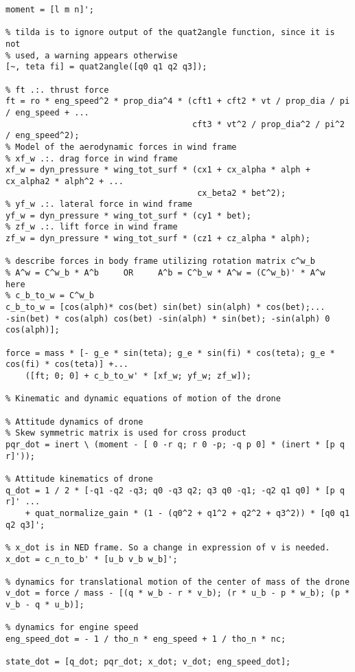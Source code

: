\begin{lstlisting}
moment = [l m n]';

% tilda is to ignore output of the quat2angle function, since it is not
% used, a warning appears otherwise
[~, teta fi] = quat2angle([q0 q1 q2 q3]);

% ft .:. thrust force 
ft = ro * eng_speed^2 * prop_dia^4 * (cft1 + cft2 * vt / prop_dia / pi / eng_speed + ...
									  cft3 * vt^2 / prop_dia^2 / pi^2 / eng_speed^2);
% Model of the aerodynamic forces in wind frame
% xf_w .:. drag force in wind frame
xf_w = dyn_pressure * wing_tot_surf * (cx1 + cx_alpha * alph + cx_alpha2 * alph^2 + ...
									   cx_beta2 * bet^2);
% yf_w .:. lateral force in wind frame
yf_w = dyn_pressure * wing_tot_surf * (cy1 * bet);
% zf_w .:. lift force in wind frame
zf_w = dyn_pressure * wing_tot_surf * (cz1 + cz_alpha * alph);

% describe forces in body frame utilizing rotation matrix c^w_b
% A^w = C^w_b * A^b     OR     A^b = C^b_w * A^w = (C^w_b)' * A^w  here
% c_b_to_w = C^w_b
c_b_to_w = [cos(alph)* cos(bet) sin(bet) sin(alph) * cos(bet);...
-sin(bet) * cos(alph) cos(bet) -sin(alph) * sin(bet); -sin(alph) 0 cos(alph)];

force = mass * [- g_e * sin(teta); g_e * sin(fi) * cos(teta); g_e * cos(fi) * cos(teta)] +...
    ([ft; 0; 0] + c_b_to_w' * [xf_w; yf_w; zf_w]);

% Kinematic and dynamic equations of motion of the drone

% Attitude dynamics of drone
% Skew symmetric matrix is used for cross product
pqr_dot = inert \ (moment - [ 0 -r q; r 0 -p; -q p 0] * (inert * [p q r]'));

% Attitude kinematics of drone
q_dot = 1 / 2 * [-q1 -q2 -q3; q0 -q3 q2; q3 q0 -q1; -q2 q1 q0] * [p q r]' ...
    + quat_normalize_gain * (1 - (q0^2 + q1^2 + q2^2 + q3^2)) * [q0 q1 q2 q3]';

% x_dot is in NED frame. So a change in expression of v is needed.
x_dot = c_n_to_b' * [u_b v_b w_b]';

% dynamics for translational motion of the center of mass of the drone
v_dot = force / mass - [(q * w_b - r * v_b); (r * u_b - p * w_b); (p * v_b - q * u_b)];

% dynamics for engine speed
eng_speed_dot = - 1 / tho_n * eng_speed + 1 / tho_n * nc;

state_dot = [q_dot; pqr_dot; x_dot; v_dot; eng_speed_dot];
\end{lstlisting}

\clearpage
\newpage

